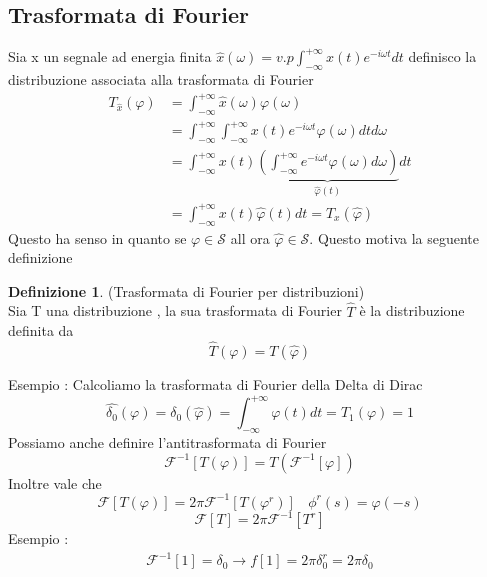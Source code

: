 \documentclass{article}
\theoremstyle{definition}
\newtheorem*{definizione}{Definizione}
\newcommand{\intinf}{\int_{-\infty}^{+\infty}}
\newcommand{\f}{\mathscr{F}}
\begin{document}
	\subsection{Trasformata di Fourier }
	Sia x un segnale ad energia finita $\widehat{x}(\omega)=v.p\intinf x(t)e^{-i\omega t} dt $ definisco la distribuzione associata alla trasformata di Fourier 
	\begin{align*}
		T_{\widehat{x}}(\varphi)&=\intinf \widehat{x}(\omega) \varphi(\omega)\\&=\intinf \intinf x(t)e^{-i\omega t} \varphi(\omega) dt d\omega \\
		&=\intinf x(t)\underbrace{\left(\intinf e^{-i\omega t}\varphi(\omega)d\omega \right)}_{\widehat{\varphi}(t)} dt  \\
		&=\intinf x(t)\widehat{\varphi}(t)dt = T_x(\widehat{\varphi })
	\end{align*} 
	Questo  ha senso in quanto se $\varphi \in \mathscr{S}$ all
	ora $\widehat{\varphi} \in \mathscr{S}$. Questo motiva la seguente definizione  
	\begin{definizione}(Trasformata di Fourier per distribuzioni) \\
		Sia T una distribuzione , la sua trasformata di Fourier $\widehat{T}$ è la distribuzione definita da 
		$$\widehat{T}(\varphi)=T(\widehat{\varphi})$$
	\end{definizione}
	Esempio : Calcoliamo la trasformata di Fourier della Delta di Dirac \\
$$
		\widehat{\delta_0}(\varphi)=\delta_0(\widehat{\varphi})=\intinf \varphi(t) dt = T_1(\varphi)=1
	$$
	Possiamo anche definire l'antitrasformata di Fourier 
	$$\mathcal{F}^{-1}[T(\varphi)]=T(\mathcal{F}^{-1}[\varphi])$$
	Inoltre vale che 
	$$\f[T(\varphi)]=2\pi \mathcal{F}^{-1}[T(\varphi^r)] \ \ \ \ \phi^r(s)=\varphi(-s)$$
	$$\f[T]=2\pi \mathcal{F}^{-1}[T^r]$$
	Esempio : 
	\begin{align*}
		\mathcal{F}^{-1}[1]=\delta_0 \rightarrow f[1]=2 \pi \delta_0^r = 2 \pi \delta_0 
	\end{align*}
	\newpage
\end{document}
